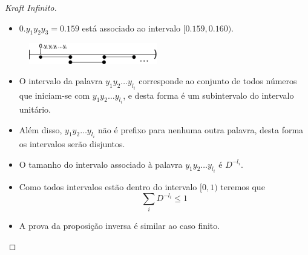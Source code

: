 \begin{frame}[allowframebreaks]
\begin{proof}[Kraft Infinito]
\begin{itemize}
\begin{itemize}
	\item $0.y_1 y_2 y_3 = 0.159$ está associado ao intervalo $[0.159, 0.160)$.
	\end{itemize}
	  \begin{figure}[h!]
	  \centering
	  \includegraphics[width=0.5\textwidth]{images/kraftintervals2.pdf}
	  \label{fig:kraftintervals}
	  \end{figure}
  \end{itemize}
  \proofbreak
  \vspace{-0.2cm}
  \begin{itemize}
  \item O intervalo da palavra $y_1 y_2 \ldots y_{l_i}$ corresponde ao conjunto de todos números que iniciam-se com
	$y_1 y_2 \ldots y_{l_i}$, e desta forma é um subintervalo do intervalo unitário.
  \item Além disso, $y_1 y_2 \ldots y_{l_i}$ não é prefixo para nenhuma outra palavra, desta forma os intervalos
	serão disjuntos.
  \item O tamanho do intervalo associado à palavra $y_1 y_2 \ldots y_{l_i}$ é $D^{-l_i}$.
  \item Como todos intervalos estão dentro do intervalo $[0,1)$ teremos que
	\begin{equation}
	\sum_i D^{-l_i} \leq 1
	\end{equation}
  \vspace{-0.2cm}
  \item A prova da proposição inversa é similar ao caso finito.
  \end{itemize}
  \end{proof}
\end{frame}


